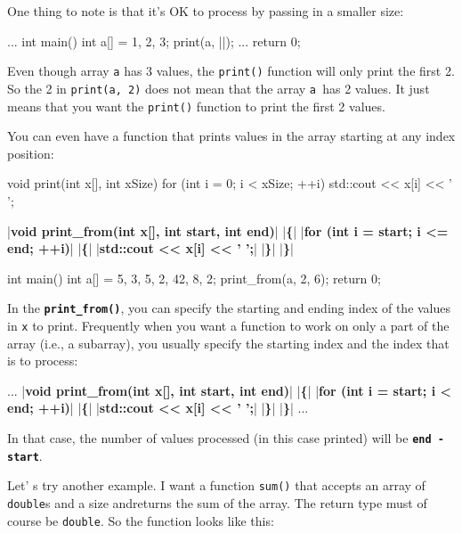 One  thing to note is that it's OK to process  by passing in a smaller size:

\begin{consolethree}[escapeinside=||]
...
int main()
{
    int a[] = {1, 2, 3};
    print(a, ||);
    ...
    return 0;
}
\end{consolethree}

Even though array \texttt{a} has 3 values, the \texttt{print()} function will only print the first 2. So the 2 in \texttt{print(a, 2)} does not mean that the array \texttt{a }has 2 values. It just means that you want the \texttt{print()} function to print the first 2 values.

You can even have a function that prints values in the array starting at any index position:

\begin{consolethree}[escapeinside=||]
void print(int x[], int xSize)
{
    for (int i = 0; i < xSize; ++i)
    {
        std::cout << x[i] << ' ';
    }
}

|\textbf{void print\_from(int x[], int start, int end)}|
|\textbf{\{}|
    |\textbf{for (int i = start; i <= end; ++i)}|
    |\textbf{\{}|
        |\textbf{std::cout << x[i] << ' ';}|
    |\textbf{\}}|
|\textbf{\}}|

int main()
{
    int a[] = {5, 3, 5, 2, 42, 8, 2};
    print_from(a, 2, 6);
    return 0;
}
\end{consolethree}

In the \texttt{\textbf{print\_from()}}, you can specify the starting and ending index of the values in \texttt{x} to print. Frequently when you want a function to work on only a part of the array (i.e., a subarray), you usually specify the starting index and the index that is  to process:

\begin{consolethree}[escapeinside=||]
...
|\textbf{void print\_from(int x[], int start, int end)}|
|\textbf{\{}|
    |\textbf{for (int i = start; i < end; ++i)}|
    |\textbf{\{}|
        |\textbf{std::cout << x[i] << ' ';}|
    |\textbf{\}}|
|\textbf{\}}|
...
\end{consolethree}

In that case, the number of values processed (in this case printed) will be \texttt{\textbf{end - start}}.

Let' s try another example. I want a function \texttt{sum()} that accepts an array of \texttt{double}s and a size andreturns the sum of the array. The return type must of course be \texttt{double}. So the function looks like this:

